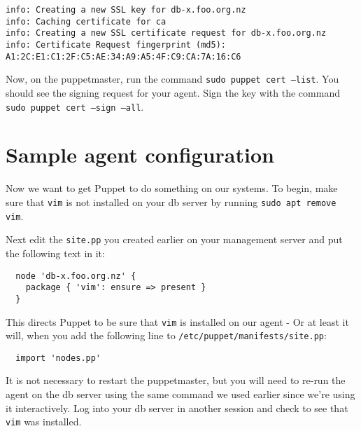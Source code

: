 \documentclass{article}
\begin{document}
\begin{verbatim}
info: Creating a new SSL key for db-x.foo.org.nz
info: Caching certificate for ca
info: Creating a new SSL certificate request for db-x.foo.org.nz
info: Certificate Request fingerprint (md5): A1:2C:E1:C1:2F:C5:AE:34:A9:A5:4F:C9:CA:7A:16:C6

\end{verbatim}

Now, on the puppetmaster, run the command \texttt{sudo puppet cert --list}.  You should see the signing request for your agent.  Sign the key with the command \texttt{ sudo puppet cert --sign --all}.

\section{Sample agent configuration}
Now we want to get Puppet to do something on our systems.  To begin, make sure that \texttt{vim} is not installed on your db server by running \texttt{sudo apt remove vim}.

Next edit the \texttt{site.pp} you created earlier on your management server and put the following text in it:
\begin{verbatim}
  node 'db-x.foo.org.nz' {
    package { 'vim': ensure => present }
  }
\end{verbatim}

This directs Puppet to be sure that \texttt{vim} is installed on our agent - Or at least it will, when you add the following line to \texttt{/etc/puppet/manifests/site.pp}:

\begin{verbatim}
  import 'nodes.pp'
\end{verbatim}

It is not necessary to restart the puppetmaster, but you will need to re-run the agent on the db server using the same command we used earlier since we're using it interactively. Log into your db server in another session and check to see that \texttt{vim} was installed.
\end{document}
